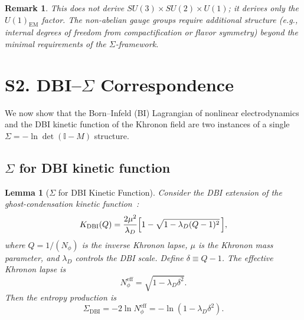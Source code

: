 \documentclass[letterpaper,twocolumn,superscriptaddress,longbibliography]{revtex4-2}
\newtheorem{lemma}[theorem]{Lemma}
\newtheorem*{remark}{Remark}
\newcommand{\SDBI}{\Sigma_{\mathrm{DBI}}}
\begin{document}
\begin{remark}
This does not derive $SU(3) \times SU(2) \times U(1)$; it
derives only the $U(1)_{\mathrm{EM}}$ factor.  The non-abelian
gauge groups require additional structure (e.g., internal
degrees of freedom from compactification or flavor symmetry)
beyond the minimal requirements of the $\Sigma$-framework.
\end{remark}


\section{S2. DBI--$\Sigma$ Correspondence}
\label{sec:DBI}

We now show that the Born--Infeld (BI) Lagrangian of
nonlinear electrodynamics and the DBI kinetic function of
the Khronon field are two instances of a single
$\Sigma = -\ln\det(\mathbb{I} - M)$ structure.

\subsection{$\Sigma$ for DBI kinetic function}
\label{sec:Sigma_DBI}

\begin{lemma}[$\Sigma$ for DBI Kinetic Function]
\label{lem:SDBI}
Consider the DBI extension of the ghost-condensation kinetic
function~\cite{ArkaniHamed2004,BS2024}:
\begin{equation}
  K_{\mathrm{DBI}}(Q)
  = \frac{2\mu^2}{\lambda_D}
    \Bigl[1 - \sqrt{1 - \lambda_D(Q-1)^2}\,\Bigr],
  \label{eq:K_DBI}
\end{equation}
where $Q = 1/(N_\phi)$ is the inverse Khronon lapse,
$\mu$ is the Khronon mass parameter, and $\lambda_D$
controls the DBI scale.  Define $\delta \equiv Q - 1$.
The effective Khronon lapse is
\begin{equation}
  N_\phi^{\mathrm{eff}}
  = \sqrt{1 - \lambda_D\delta^2}.
  \label{eq:N_DBI}
\end{equation}
Then the entropy production is
\begin{equation}
  \SDBI = -2\ln N_\phi^{\mathrm{eff}}
       = -\ln(1 - \lambda_D\delta^2).
  \label{eq:Sigma_DBI}
\end{equation}
\end{lemma}
\end{document}
